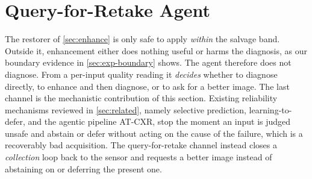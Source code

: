 
\section{Query-for-Retake Agent}\label{sec:agent}

The restorer of \cref{sec:enhance} is only safe to apply \emph{within} the salvage band. Outside it,
enhancement either does nothing useful or harms the diagnosis, as our boundary evidence in
\cref{sec:exp-boundary} shows. The agent therefore does not diagnose. From a per-input quality reading
it \emph{decides} whether to diagnose directly, to enhance and then diagnose, or to ask for a better
image. The last channel is the mechanistic contribution of this section. Existing reliability
mechanisms reviewed in \cref{sec:related}, namely selective prediction, learning-to-defer, and the
agentic pipeline AT-CXR, stop the moment an input is judged unsafe and abstain or defer without acting
on the cause of the failure, which is a recoverably bad acquisition. The query-for-retake channel
instead closes a \emph{collection} loop back to the sensor and requests a better image instead of
abstaining on or deferring the present one.

